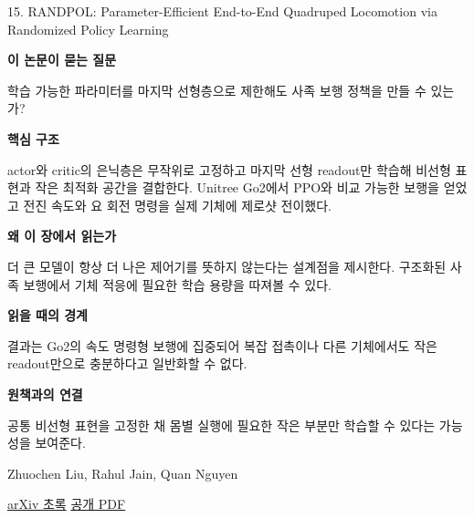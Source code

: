 \documentclass[11pt,openany]{book}
\begin{document}
\begin{termcard}{15. RANDPOL: Parameter-Efficient End-to-End Quadruped Locomotion via Randomized Policy Learning}

\par

\medskip

{\sffamily\bfseries\color{deepblue} 이 논문이 묻는 질문}\par

학습 가능한 파라미터를 마지막 선형층으로 제한해도 사족 보행 정책을 만들 수 있는가?

\smallskip

{\sffamily\bfseries\color{deepblue} 핵심 구조}\par

actor와 critic의 은닉층은 무작위로 고정하고 마지막 선형 readout만 학습해 비선형 표현과 작은 최적화 공간을 결합한다. Unitree Go2에서 PPO와 비교 가능한 보행을 얻었고 전진 속도와 요 회전 명령을 실제 기체에 제로샷 전이했다.

\smallskip

{\sffamily\bfseries\color{deepblue} 왜 이 장에서 읽는가}\par

더 큰 모델이 항상 더 나은 제어기를 뜻하지 않는다는 설계점을 제시한다. 구조화된 사족 보행에서 기체 적응에 필요한 학습 용량을 따져볼 수 있다.

\smallskip

{\sffamily\bfseries\color{coral} 읽을 때의 경계}\par

결과는 Go2의 속도 명령형 보행에 집중되어 복잡 접촉이나 다른 기체에서도 작은 readout만으로 충분하다고 일반화할 수 없다.

\smallskip

{\sffamily\bfseries\color{teal} 원책과의 연결}\par

공통 비선형 표현을 고정한 채 몸별 실행에 필요한 작은 부분만 학습할 수 있다는 가능성을 보여준다.

\medskip

{\footnotesize\color{muted} Zhuochen Liu, Rahul Jain, Quan Nguyen\par

\href{https://arxiv.org/abs/2505.19054}{arXiv 초록} \quad \href{https://arxiv.org/pdf/2505.19054}{공개 PDF}\par}

\end{termcard}
\end{document}
